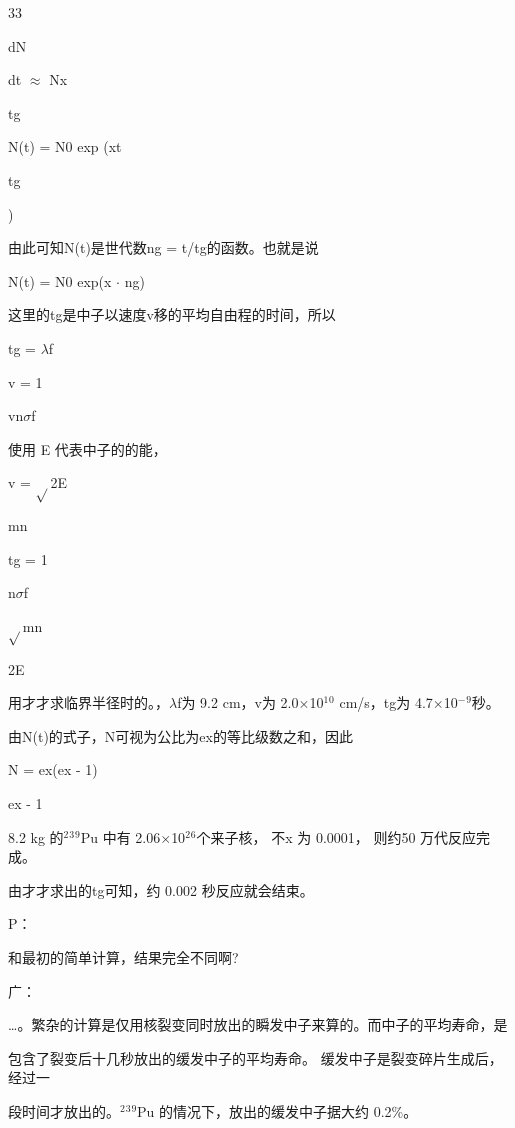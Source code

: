 33\par
dN\par
dt $\approx$ Nx\par
tg\par
N(t) = N0 exp (xt\par
tg\par
)\par
由此可知N(t)是世代数ng = t/tg的函数。也就是说\par
N(t) = N0 exp(x $\cdot$ ng)\par
这里的tg是中子以速度v移的平均自由程的时间，所以\par
tg = $\lambda$f\par
v = 1\par
vn$\sigma$f\par
使用 E 代表中子的的能，\par
v = $\sqrt{}$2E\par
mn\par
tg = 1\par
n$\sigma$f\par
$\sqrt{}$mn\par
2E\par
用才才求临界半径时的。，$\lambda$f为 9.2 cm，v为 2.0$\times$10$^{1}$$^{0}$ cm/s，tg为 4.7$\times$10$^{-}$$^{9}$秒。\par
由N(t)的式子，N可视为公比为ex的等比级数之和，因此\par
N = ex(ex - 1)\par
ex - 1\par
8.2 kg 的$^{2}$$^{3}$$^{9}$Pu 中有 2.06$\times$10$^{2}$$^{6}$个来子核， 不x 为 0.0001， 则约50 万代反应完成。\par
由才才求出的tg可知，约 0.002 秒反应就会结束。\par
P：\par
和最初的简单计算，结果完全不同啊?\par
广：\par
…。繁杂的计算是仅用核裂变同时放出的瞬发中子来算的。而中子的平均寿命，是\par
包含了裂变后十几秒放出的缓发中子的平均寿命。 缓发中子是裂变碎片生成后， 经过一\par
段时间才放出的。$^{2}$$^{3}$$^{9}$Pu 的情况下，放出的缓发中子据大约 0.2\%。\par

